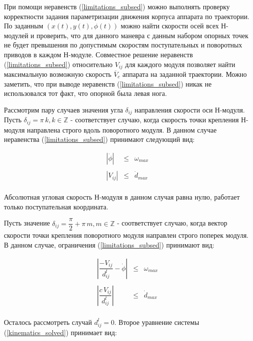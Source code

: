 При помощи неравенств (\ref{limitations_subsed}) можно выполнять проверку корректности задания параметризации движения корпуса аппарата по траектории. По заданным $(x(t),y(t),\phi(t))$ можно найти скорости осей всех Н-модулей и проверить, что для данного маневра с данным набором опорных точек не будет превышения по допустимым скоростям поступательных и поворотных приводов в каждом Н-модуле. Совместное решение неравенств (\ref{limitations_subsed}) относительно $V_{ij}$ для каждого модуля позволяет найти максимальную возможную скорость $\overline{V}_c$ аппарата на заданной траектории. Можно заметить, что при выводе неравенств (\ref{limitations_subsed}) никак не использовался тот факт, что опорной была левая нога. 

Рассмотрим пару случаев значения угла $\delta_{ij}$ направления скорости оси Н-модуля. Пусть $\delta_{ij} = \pi\,k,k\in \mathbb{Z}$ - соответствует случаю, когда скорость точки крепления Н-модуля направлена строго вдоль поворотного модуля. В данном случае неравенства (\ref{limitations_subsed}) принимают следующий вид:

\begin{equation}
\begin{array}{rcl}
|\dot{\phi}|&\leq&\omega_{max}\\
\\
|V_{ij}|&\leq&\dot{d}_{max}\\
\end{array}
\end{equation}

Абсолютная угловая скорость Н-модуля в данном случая равна нулю, работает только поступательная координата.

Пусть значение $\delta_{ij} = \dfrac{\pi}{2}+\pi\,m, m \in \mathbb{Z}$ - соответствует случаю, когда вектор скорости точки крепления поворотного модуля направлен строго поперек модуля. В данном случае, ограничения (\ref{limitations_subsed}) принимают вид:

\begin{equation}
\begin{array}{rcl}
|\dfrac{-V_{ij}}{d^l_{ij}}-\dot{\phi}|&\leq&\omega_{max}\\
\\
|\dfrac{c\,V_{ij}}{d^l_{ij}}|&\leq&\dot{d}_{max}\\
\end{array}
\end{equation}

Осталось рассмотреть случай $d^l_{ij}=0$. Второе уравнение системы (\ref{kinematics_solved}) принимает вид:

